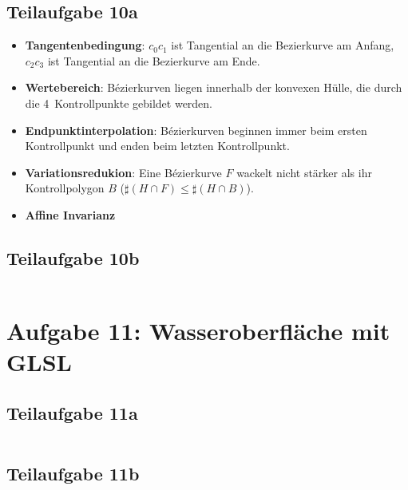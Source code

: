 \documentclass[a4paper]{scrartcl}
\begin{document}
\subsection*{Teilaufgabe 10a}

\begin{itemize}
    \item \textbf{Tangentenbedingung}:
          $c_0 c_1$ ist Tangential an die Bezierkurve am Anfang,
          $c_2 c_3$ ist Tangential an die Bezierkurve am Ende.
    \item \textbf{Wertebereich}: Bézierkurven liegen innerhalb der konvexen
          Hülle, die durch die 4~Kontrollpunkte gebildet werden.
    \item \textbf{Endpunktinterpolation}: Bézierkurven beginnen immer beim
          ersten Kontrollpunkt und enden beim letzten Kontrollpunkt.
    \item \textbf{Variationsredukion}: Eine Bézierkurve $F$ wackelt nicht stärker
          als ihr Kontrollpolygon $B$ ($\sharp (H \cap F) \leq \sharp (H \cap B)$).
    \item \textbf{Affine Invarianz}
\end{itemize}

\clearpage
\subsection*{Teilaufgabe 10b}
\inputminted[linenos, numbersep=5pt, tabsize=4, frame=lines, label=shader.vert]{glsl}{shader.vert}

\clearpage
\section*{Aufgabe 11: Wasseroberfläche mit GLSL}
\subsection*{Teilaufgabe 11a}
\inputminted[linenos, numbersep=5pt, tabsize=4, frame=lines, label=shader.frag]{glsl}{shader.frag}

\clearpage
\subsection*{Teilaufgabe 11b}
\inputminted[linenos, numbersep=5pt, tabsize=4, frame=lines, label=shader.frag]{glsl}{shaderb.frag}
\end{document}
